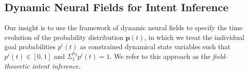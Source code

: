 \documentclass[journal]{IEEEtran}
\begin{document}
\subsection{Dynamic Neural Fields for Intent Inference}\label{ssec:dft_ii}

Our insight is to use the framework of dynamic neural fields to specify the time evolution of the probability distribution $\boldsymbol{p}(t)$, in which we treat the individual goal probabilities $p^i(t)$ as constrained dynamical state variables such that $p^i(t) \in [0, 1]$ and $\Sigma_{1}^{n_g}p^{i}(t) = 1$. We refer to this approach as the \textit{field-theoretic intent inference.}
\end{document}
